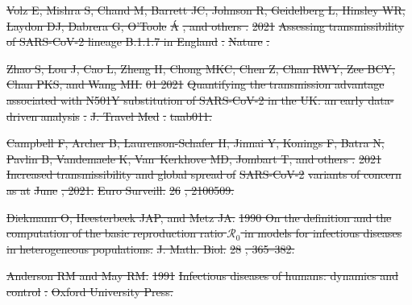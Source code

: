 \documentclass[12pt]{article}
\providecommand{\DIFdeltex}[1]{{\protect\color{red}\sout{#1}}}                      %
\providecommand{\DIFdel}[1]{\texorpdfstring{\DIFdeltex{#1}}{}} %
\begin{document}
\DIFdel{Volz E, Mishra S, Chand M, Barrett JC, Johnson R, Geidelberg L, Hinsley WR,
  Laydon DJ, Dabrera G, O'Toole }%
\DIFdel{\'A}%
\DIFdel{, and others .
}%
\DIFdel{2021 }%
\DIFdel{Assessing transmissibility of SARS-CoV-2 lineage B.1.1.7 in
  England}%
\DIFdel{.
}%
\DIFdel{Nature}%
\DIFdel{.
}%

\DIFdel{Zhao S, Lou J, Cao L, Zheng H, Chong MKC, Chen Z, Chan RWY, Zee BCY, Chan PKS,
  and Wang MH.
}%
\DIFdel{01 2021 }%
\DIFdel{Quantifying the transmission advantage associated with N501Y
  substitution of SARS-CoV-2 in the UK: an early data-driven analysis}%
\DIFdel{.
}%
\DIFdel{J. Travel Med}%
\DIFdel{.
}%
\DIFdel{taab011.
}%

\DIFdel{Campbell F, Archer B, Laurenson-Schafer H, Jinnai Y, Konings F, Batra N, Pavlin
  B, Vandemaele K, Van~Kerkhove MD, Jombart T, and others .
}%
\DIFdel{2021 Increased transmissibility and global spread of }%
\DIFdel{SARS-CoV-2}%
\DIFdel{variants of concern as at }%
\DIFdel{June}%
\DIFdel{, 2021.
}%
\DIFdel{Euro Surveill.}%
\DIFdel{26}%
\DIFdel{, 2100509.
}%

\DIFdel{Diekmann O, Heesterbeek JAP, and Metz JA.
}%
\DIFdel{1990 On the definition and the computation of the basic reproduction
  ratio $\mathcal{R}_0$ in models for infectious diseases in heterogeneous
  populations.
}%
\DIFdel{J. Math. Biol.}%
\DIFdel{28}%
\DIFdel{, 365--382.
}%

\DIFdel{Anderson RM and May RM.
}%
\DIFdel{1991 }%
\DIFdel{Infectious diseases of humans: dynamics and control}%
\DIFdel{.
}%
\DIFdel{Oxford University Press.
}%
\end{document}
